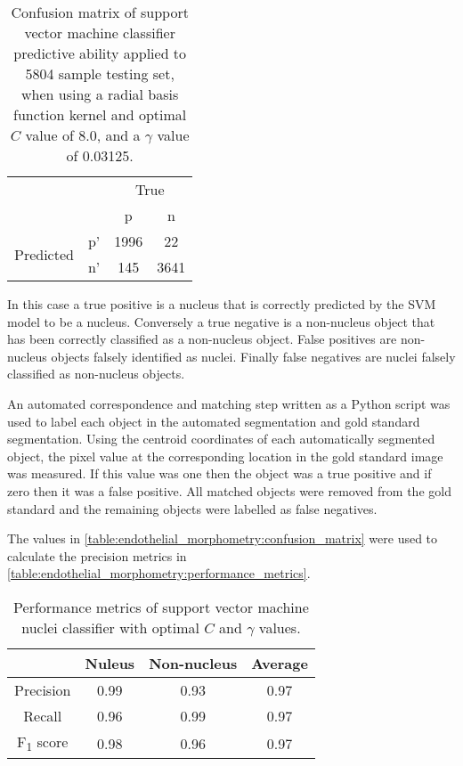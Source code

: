 \begin{table}[htbp]
\caption[Confusion matrix of support vector machine nuclei predictive ability]{Confusion matrix of support vector machine classifier predictive ability applied to 5804 sample testing set, when using a radial basis function kernel and optimal $C$ value of 8.0, and a $\gamma$ value of 0.03125. }
\label{table:endothelial_morphometry:confusion_matrix}
\centering
\begin{tabular}{cc|cc}
	\multicolumn{2}{c}{}&\multicolumn{2}{c}{True}\\
	\multicolumn{2}{c|}{}& p & n\\
	\cline{2-4}
	\multirow{2}{*}{Predicted}& p' & 1996 & 22\\ & n' & 145 & 3641\\
\end{tabular}
\end{table}

In this case a true positive is a nucleus that is correctly predicted by the SVM model to be a nucleus. Conversely a true negative is a non-nucleus object that has been correctly classified as a non-nucleus object. False positives are non-nucleus objects falsely identified as nuclei. Finally false negatives are nuclei falsely classified as non-nucleus objects.

An automated correspondence and matching step written as a Python script was used to label each object in the automated segmentation and gold standard segmentation. Using the centroid coordinates of each automatically segmented object, the pixel value at the corresponding location in the gold standard image was measured. If this value was one then the object was a true positive and if zero then it was a false positive. All matched objects were removed from the gold standard and the remaining objects were labelled as false negatives.

The values in \autoref{table:endothelial_morphometry:confusion_matrix} were used to calculate the precision metrics in \autoref{table:endothelial_morphometry:performance_metrics}.

\begin{table}[htbp]
\caption[Performance metrics of support vector machine nuclei classification]{Performance metrics of support vector machine nuclei classifier with optimal $C$ and $\gamma$ values.}
\centering
\label{table:endothelial_morphometry:performance_metrics}
\begin{tabular}{c c c c}
	\toprule
	& Nuleus & Non-nucleus & Average\\
	\midrule
	Precision & 0.99 & 0.93 & 0.97 \\
	Recall    & 0.96 & 0.99 & 0.97 \\
	F\textsubscript{1} score  & 0.98 & 0.96 & 0.97 \\
	\bottomrule
\end{tabular}
\end{table}

